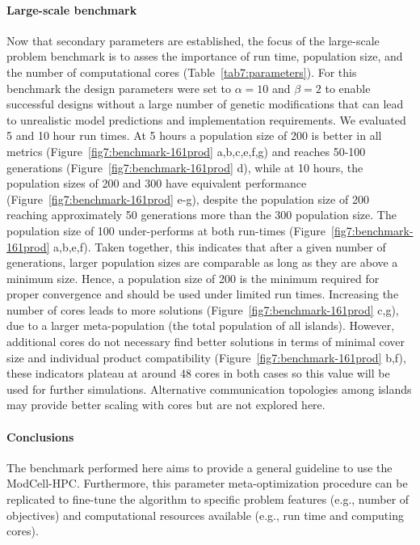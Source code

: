 \documentclass[12pt]{article}
\begin{document}
{\paragraph{Large-scale benchmark}
Now that secondary parameters are established, the focus of the large-scale problem benchmark is to asses the importance of run time, population size, and the number of computational cores (Table~\ref{tab7:parameters}).
For this benchmark the design parameters were set to $\alpha=10$ and $\beta=2$ to enable successful designs without a large number of genetic modifications that can lead to unrealistic model predictions and implementation requirements.
We evaluated 5 and 10 hour run times. At 5 hours a population size of 200 is better in all metrics (Figure~\ref{fig7:benchmark-161prod} a,b,c,e,f,g) and reaches 50-100 generations (Figure~\ref{fig7:benchmark-161prod} d), while at 10 hours, the population sizes of 200 and 300 have equivalent performance (Figure~\ref{fig7:benchmark-161prod} e-g), despite the population size of 200 reaching  approximately 50 generations more than the 300 population size.
The population size of 100 under-performs at both run-times (Figure~\ref{fig7:benchmark-161prod} a,b,e,f).
Taken together, this indicates that after a given number of generations, larger population sizes are comparable as long as they are above a minimum size.
Hence, a population size of 200 is the minimum required for proper convergence and should be used under limited run times.
Increasing the number of cores leads to more solutions (Figure~\ref{fig7:benchmark-161prod} c,g), due to a larger meta-population (the total population of all islands). However, additional cores do not necessary find better solutions in terms of minimal cover size and individual product compatibility
(Figure~\ref{fig7:benchmark-161prod} b,f), these indicators plateau at around 48 cores in both cases so this value will be used for further simulations.
Alternative communication topologies among islands \citep{hijaze2009} may provide better scaling with cores but are not explored here.


\paragraph{Conclusions}
The benchmark performed here aims to provide a general guideline to use the ModCell-HPC. Furthermore, this parameter meta-optimization procedure can be replicated to fine-tune the algorithm to specific problem features (e.g., number of objectives) and computational resources available (e.g., run time and computing cores).

}
\end{document}
